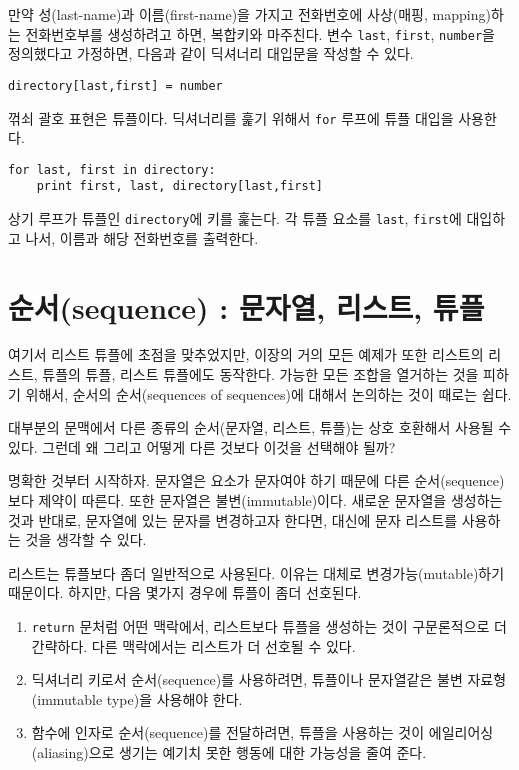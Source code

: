 만약 성(last-name)과 이름(first-name)을 가지고 전화번호에 사상(매핑, mapping)하는 전화번호부를 생성하려고 하면, 복합키와 마주친다.
변수 {\tt last}, {\tt first}, {\tt number}을 정의했다고 가정하면, 다음과 같이 딕셔너리 대입문을 작성할 수 있다.

\beforeverb
\begin{verbatim}
directory[last,first] = number
\end{verbatim}
\afterverb
%

꺾쇠 괄호 표현은 튜플이다. 
딕셔너리를 훑기 위해서 {\tt for} 루프에 튜플 대입을 사용한다.


\beforeverb
\begin{verbatim}
for last, first in directory:
    print first, last, directory[last,first]
\end{verbatim}
\afterverb
%

상기 루프가 튜플인 {\tt directory}에 키를 훑는다. 
각 튜플 요소를 {\tt last}, {\tt first}에 대입하고 나서, 이름과 해당 전화번호를 출력한다.

\section{순서(sequence) : 문자열, 리스트, 튜플}

여기서 리스트 튜플에 초점을 맞추었지만, 이장의 거의 모든 예제가 또한 리스트의 리스트, 튜플의 튜플, 리스트 튜플에도 동작한다.
가능한 모든 조합을 열거하는 것을 피하기 위해서, 순서의 순서(sequences of sequences)에 대해서 논의하는 것이 때로는 쉽다.

대부분의 문맥에서 다른 종류의 순서(문자열, 리스트, 튜플)는 상호 호환해서 사용될 수 있다. 
그런데 왜 그리고 어떻게 다른 것보다 이것을 선택해야 될까?


명확한 것부터 시작하자.
문자열은 요소가 문자여야 하기 때문에 다른 순서(sequence)보다 제약이 따른다.
또한 문자열은 불변(immutable)이다. 
새로운 문자열을 생성하는 것과 반대로, 문자열에 있는 문자를 변경하고자 한다면, 
대신에 문자 리스트를 사용하는 것을 생각할 수 있다.

리스트는 튜플보다 좀더 일반적으로 사용된다. 
이유는 대체로 변경가능(mutable)하기 때문이다.
하지만, 다음 몇가지 경우에 튜플이 좀더 선호된다.

\begin{enumerate}

\item {\tt return} 문처럼 어떤 맥락에서, 리스트보다 튜플을 생성하는 것이 구문론적으로 더 간략하다.
다른 맥락에서는 리스트가 더 선호될 수 있다.

\item 딕셔너리 키로서 순서(sequence)를 사용하려면, 튜플이나 문자열같은 불변 자료형(immutable type)을 사용해야 한다.

\item 함수에 인자로 순서(sequence)를 전달하려면, 튜플을 사용하는 것이 에일리어싱(aliasing)으로 생기는 예기치 못한 행동에 대한 가능성을 줄여 준다.

\end{enumerate}

